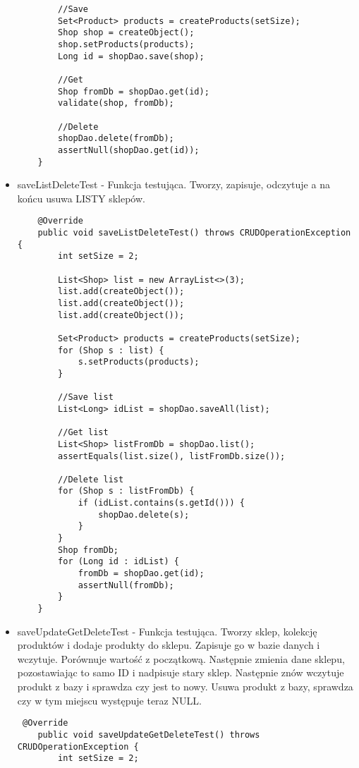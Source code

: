 \documentclass[a4paper,11pt,notitlepage]{article}
\begin{document}
\begin{itemize}
\begin{footnotesize}
\begin{verbatim}
        //Save
        Set<Product> products = createProducts(setSize);
        Shop shop = createObject();
        shop.setProducts(products);
        Long id = shopDao.save(shop);

        //Get
        Shop fromDb = shopDao.get(id);
        validate(shop, fromDb);

        //Delete
        shopDao.delete(fromDb);
        assertNull(shopDao.get(id));
    }
\end{verbatim}\end{footnotesize}
\item saveListDeleteTest - Funkcja testująca. Tworzy, zapisuje, odczytuje a na końcu usuwa LISTY sklepów.
\begin{footnotesize}\begin{verbatim}
    @Override
    public void saveListDeleteTest() throws CRUDOperationException {
        int setSize = 2;

        List<Shop> list = new ArrayList<>(3);
        list.add(createObject());
        list.add(createObject());
        list.add(createObject());

        Set<Product> products = createProducts(setSize);
        for (Shop s : list) {
            s.setProducts(products);
        }

        //Save list
        List<Long> idList = shopDao.saveAll(list);

        //Get list
        List<Shop> listFromDb = shopDao.list();
        assertEquals(list.size(), listFromDb.size());

        //Delete list
        for (Shop s : listFromDb) {
            if (idList.contains(s.getId())) {
                shopDao.delete(s);
            }
        }
        Shop fromDb;
        for (Long id : idList) {
            fromDb = shopDao.get(id);
            assertNull(fromDb);
        }
    }
\end{verbatim}\end{footnotesize}

\item saveUpdateGetDeleteTest - Funkcja testująca. Tworzy sklep, kolekcję produktów i dodaje produkty do sklepu.  Zapisuje go w bazie danych i wczytuje. Porównuje wartość z początkową. Następnie zmienia dane sklepu, pozostawiając to samo ID i nadpisuje stary sklep. Następnie znów wczytuje produkt z bazy i sprawdza czy jest to nowy. Usuwa produkt z bazy, sprawdza czy w tym miejscu występuje teraz NULL.
\begin{footnotesize}\begin{verbatim}
 @Override
    public void saveUpdateGetDeleteTest() throws CRUDOperationException {
        int setSize = 2;


\end{verbatim}
\end{footnotesize}
\end{itemize}
\end{document}
